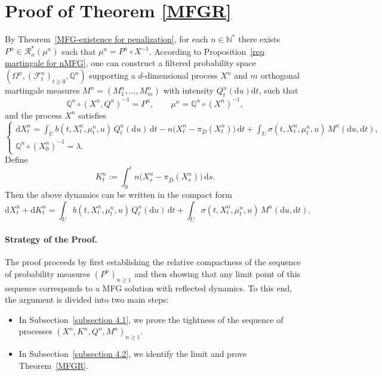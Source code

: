 \documentclass[11pt,amsfonts]{article}
\theoremstyle{plain}
\theoremstyle{assumpstyle}
\numberwithin{equation}{section}
\numberwithin{theorem}{section}
\numberwithin{proposition}{section}
\numberwithin{definition}{section}
\numberwithin{remark}{section}
\numberwithin{corollary}{section}
\numberwithin{lemma}{section}
\begin{document}
\section{Proof of Theorem \ref{MFGR}}\label{section-proof}
By Theorem~\ref{MFG-existence for penalization}, for each $n \in \mathbb{N}^*$ there exists 
$P^n \in \mathcal{R}_n^*(\mu^n)$ such that $\mu^n = P^n \circ X^{-1}$. 
According to Proposition~\ref{rep martingale for nMFG}, one can construct a filtered probability space 
$(\Omega^n, (\mathcal{F}^n_t)_{t\ge0}, \mathbb{Q}^n)$ supporting a $d$-dimensional process $X^n$ and 
$m$ orthogonal martingale measures $M^n = (M^n_1, \dots, M^n_m)$ with intensity 
$Q^n_t(\mathrm{d}u)\mathrm{d}t$, such that
\begin{equation*}
\mathbb{Q}^n \circ (X^n, Q^n)^{-1} = P^n, 
\qquad 
\mu^n = \mathbb{Q}^n \circ (X^n)^{-1},
\end{equation*}
and the process $X^n$ satisfies
\begin{equation*}
\begin{cases}
\mathrm{d}X^n_t
= \displaystyle\int_U b(t,X^n_t,\mu^n_t,u)\,Q^n_t(\mathrm{d}u)\,\mathrm{d}t
- n\big(X^n_t - \pi_{\bar D}(X^n_t)\big)\,\mathrm{d}t
+ \displaystyle\int_U \sigma(t,X^n_t,\mu^n_t,u)\,M^n(\mathrm{d}u,\mathrm{d}t),\\
\mathbb{Q}^n \circ (X^n_0)^{-1} = \lambda .
\end{cases}
\end{equation*}
Define
\begin{equation*}
K^n_t := \int_0^t n\big(X^n_s - \pi_{\bar D}(X^n_s)\big)\,\mathrm{d}s .
\end{equation*}
Then the above dynamics can be written in the compact form
\begin{equation}\label{equation1}
\mathrm{d}X^n_t + \mathrm{d}K^n_t
= \int_U b(t,X^n_t,\mu^n_t,u)\,Q^n_t(\mathrm{d}u)\,\mathrm{d}t
+ \int_U \sigma(t,X^n_t,\mu^n_t,u)\,M^n(\mathrm{d}u,\mathrm{d}t).
\end{equation}
\paragraph*{Strategy of the Proof.}
The proof proceeds by first establishing the relative compactness of the sequence of probability measures $(P^n)_{n \ge 1}$ and then showing that any limit point of this sequence corresponds to a MFG solution with reflected dynamics. To this end, the argument is divided into two main steps:
\begin{itemize}
    \item In Subsection~\ref{subsection 4.1}, we prove the tightness of the sequence of processes $(X^n, K^n, Q^n, M^n)_{n \geq 1}$.
    \item In Subsection~\ref{subsection 4.2}, we identify the limit and prove Theorem~\ref{MFGR}.
\end{itemize}
\end{document}
